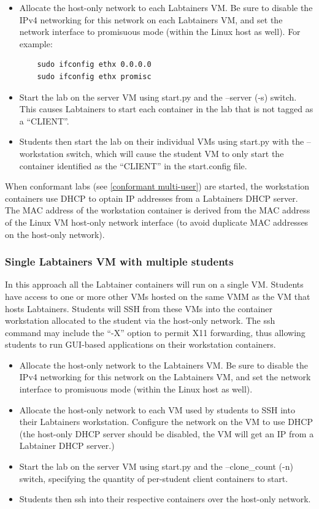 \documentclass[12pt]{article}
\begin{document}
\begin{itemize}
\item Allocate the host-only network to each Labtainers VM.  Be sure
to disable the IPv4 networking for this network on each Labtainers VM, and
set the network interface to promisuous mode (within the Linux host as well).
For example:
\begin{verbatim}
    sudo ifconfig ethx 0.0.0.0
    sudo ifconfig ethx promisc
\end{verbatim} 

\item Start the lab on the server VM using start.py and the --server (-s) switch. This
causes Labtainers to start each container in the lab that is not tagged as a ``CLIENT''. 

\item Students then
start the lab on their individual VMs using start.py with the --workstation switch, which will cause
the student VM to only start the container identified as the ``CLIENT'' in the start.config file.
\end{itemize}

When conformant labs (see \ref{conformant multi-user}) are started, the workstation containers 
use DHCP to optain IP addresses from a Labtainers DHCP server.  The MAC address of the workstation
container is derived from the MAC address of the Linux VM host-only network interface (to avoid
duplicate MAC addresses on the host-only network). 

\subsubsection {Single Labtainers VM with multiple students}
In this approach all the Labtainer containers will run on a single VM.  
Students have access to one or more other
VMs hosted on the same VMM as the VM that hosts Labtainers. Students will SSH from these VMs into the container workstation
allocated to the student via the host-only network.  The ssh command may include the ``-X'' option to permit X11 forwarding, thus allowing students to
run GUI-based applications on their workstation containers.

\begin{itemize}
\item Allocate the host-only network to the Labtainers VM. Be sure
to disable the IPv4 networking for this network on the Labtainers VM, and
set the network interface to promisuous mode (within the Linux host as well).
\item Allocate the host-only network to each VM used by students to SSH into their
Labtainers workstation.  Configure the network on the VM to use DHCP (the host-only
DHCP server should be disabled, the VM will get an IP from a Labtainer DHCP server.)

\item Start the lab on the server VM using start.py and the --clone\_count (-n) switch,
specifying the quantity of per-student client containers to start.

\item Students then ssh into their respective containers over the host-only network.
\end{itemize}
\end{document}
